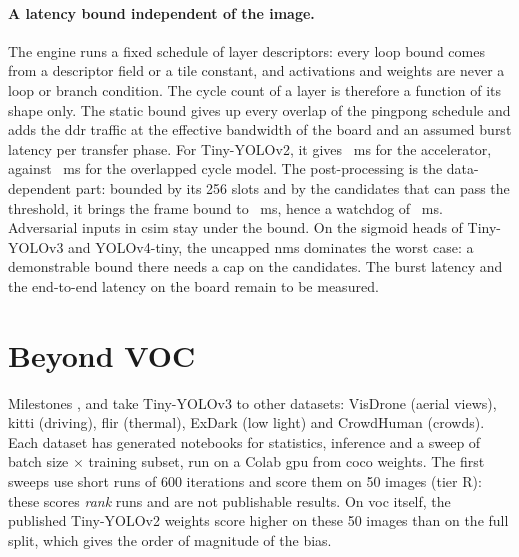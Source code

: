 \documentclass[11pt,a4paper]{article}
\begin{document}
\paragraph{A latency bound independent of the image.} The engine runs a fixed schedule of
layer descriptors: every loop bound comes from a descriptor field or a \gls{tile} constant, and
activations and weights are never a loop or branch condition. The cycle count of a layer is
therefore a function of its shape only. The static bound gives up every overlap of the
\gls{pingpong} schedule and adds the \gls{ddr} traffic at the effective bandwidth of the board and an
assumed \gls{burst} latency per transfer phase. For Tiny-YOLOv2, it gives
~ms for the accelerator, against ~ms for
the overlapped cycle model. The post-processing is the data-dependent part: bounded by its
256 slots and by the candidates that can pass the threshold, it brings the frame bound to
~ms, hence a \gls{watchdog} of ~ms.
Adversarial inputs in \gls{csim} stay under the bound. On the sigmoid heads of
Tiny-YOLOv3 and YOLOv4-tiny, the uncapped \gls{nms} dominates the worst case: a demonstrable
bound there needs a cap on the candidates. The \gls{burst} latency and the end-to-end latency on
the board remain to be measured.

\section{Beyond VOC}\label{sec:beyond}

Milestones ,  and  take Tiny-YOLOv3 to other datasets: VisDrone (aerial views),
\gls{kitti} (driving), \gls{flir} (thermal), ExDark (low light) and CrowdHuman (crowds). Each dataset
has generated notebooks for statistics, inference and a sweep of batch size $\times$
training subset, run on a Colab \gls{gpu} from \gls{coco} weights. The first sweeps use short runs of
600 iterations and score them on 50 images (\gls{tier} R): these scores \emph{rank} runs and are
not publishable results. On \gls{voc} itself, the published Tiny-YOLOv2 weights score higher on
these 50 images than on the full split, which gives the order of magnitude of the bias.

\begin{table}[htbp]
\caption{Best run of the first sweep of each dataset
().}
\label{tab:sweeps}
\footnotesize{}
\end{table}
\end{document}
